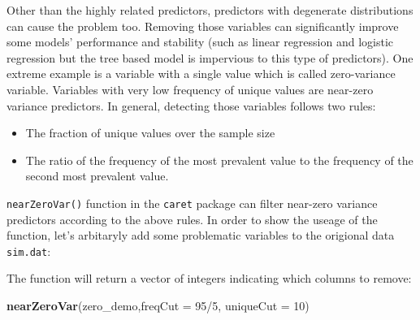 \documentclass[12pt,]{krantz}
\newenvironment{Shaded}{\begin{snugshade}}{\end{snugshade}}
\newcommand{\KeywordTok}[1]{\textcolor[rgb]{0.13,0.29,0.53}{\textbf{{#1}}}}
\newcommand{\DataTypeTok}[1]{\textcolor[rgb]{0.13,0.29,0.53}{{#1}}}
\newcommand{\DecValTok}[1]{\textcolor[rgb]{0.00,0.00,0.81}{{#1}}}
\newcommand{\CommentTok}[1]{\textcolor[rgb]{0.56,0.35,0.01}{\textit{{#1}}}}
\newcommand{\NormalTok}[1]{{#1}}
\providecommand{\tightlist}{%
  \setlength{\itemsep}{0pt}\setlength{\parskip}{0pt}}
\theoremstyle{definition}
\theoremstyle{definition}
\theoremstyle{remark}
\begin{document}
Other than the highly related predictors, predictors with degenerate
distributions can cause the problem too. Removing those variables can
significantly improve some models' performance and stability (such as
linear regression and logistic regression but the tree based model is
impervious to this type of predictors). One extreme example is a
variable with a single value which is called zero-variance variable.
Variables with very low frequency of unique values are near-zero
variance predictors. In general, detecting those variables follows two
rules:

\begin{itemize}
\tightlist
\item
  The fraction of unique values over the sample size
\item
  The ratio of the frequency of the most prevalent value to the
  frequency of the second most prevalent value.
\end{itemize}

\texttt{nearZeroVar()} function in the \texttt{caret} package can filter
near-zero variance predictors according to the above rules. In order to
show the useage of the function, let's arbitaryly add some problematic
variables to the origional data \texttt{sim.dat}:

\begin{Shaded}
\end{Shaded}

The function will return a vector of integers indicating which columns
to remove:

\begin{Shaded}
\begin{Highlighting}[]
\KeywordTok{nearZeroVar}\NormalTok{(zero_demo,}\DataTypeTok{freqCut =} \DecValTok{95}\NormalTok{/}\DecValTok{5}\NormalTok{, }\DataTypeTok{uniqueCut =} \DecValTok{10}\NormalTok{)}
\end{Highlighting}
\end{Shaded}
\end{document}
